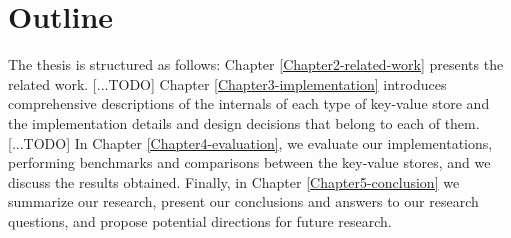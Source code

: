 \section{Outline}

The thesis is structured as follows: Chapter \ref{Chapter2-related-work} presents the related work. [...TODO]
Chapter \ref{Chapter3-implementation} introduces comprehensive descriptions of the internals of each type of key-value store and the implementation details and design decisions that belong to each of them. [...TODO]
In Chapter \ref{Chapter4-evaluation}, we evaluate our implementations, performing benchmarks and comparisons between the key-value stores, and we discuss the results obtained.
Finally, in Chapter \ref{Chapter5-conclusion} we summarize our research, present our conclusions and answers to our research questions, and propose potential directions for future research. %
